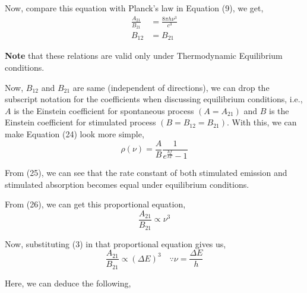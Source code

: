 \documentclass[12pt]{article}
\begin{document}
Now, compare this equation with Planck's law in Equation (9), we get,
\begin{align}
    \frac{A_{21}}{B_{21}} & = \frac{8\pi h \nu^3}{c^3} \\
    B_{12} & = B_{21}
\end{align}

\textbf{Note} that these relations are valid only under Thermodynamic Equilibrium conditions. \vspace{.2cm}

Now, $B_{12}$ and $B_{21}$ are same (independent of directions), we can drop the subscript notation for the coefficients when discussing equilibrium conditions, i.e., $A$ is the Einstein coefficient for spontaneous process $(A = A_{21})$ and $B$ is the Einstein coefficient for stimulated process $(B = B_{12} = B_{21})$. With this, we can make Equation (24) look more simple,
\begin{equation*}
    \rho(\nu) = \frac{A}{B} \frac{1}{e^{\frac{hf}{kT}} - 1}
\end{equation*} 

From (25), we can see that the rate constant of both stimulated emission and stimulated absorption becomes equal under equilibrium conditions. \vspace{.2cm} 

From (26), we can get this proportional equation,
\begin{equation*}
    \frac{A_{21}}{B_{21}} \propto \nu^{3}
\end{equation*}

Now, substituting (3) in that proportional equation gives us,
\begin{equation}
    \frac{A_{21}}{B_{21}} \propto (\Delta E)^{3} \quad \because \nu = \frac{\Delta E}{h}
\end{equation}

Here, we can deduce the following, 
\end{document}
